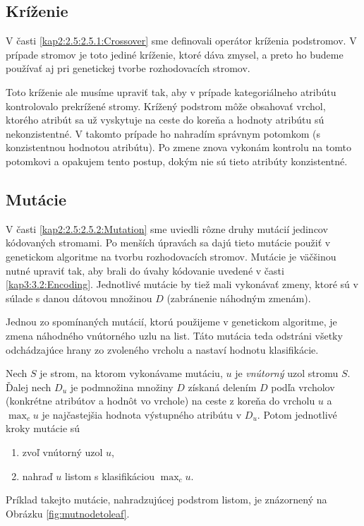 \subsection{Kríženie}\label{kap3:3.4:3.4.1:Crossover}
V časti \ref{kap2:2.5:2.5.1:Crossover} sme definovali operátor kríženia podstromov. V prípade stromov je toto jediné kríženie, ktoré dáva zmysel, a preto ho budeme používať aj pri genetickej tvorbe rozhodovacích stromov.

Toto kríženie ale musíme upraviť tak, aby v prípade kategoriálneho atribútu kontrolovalo prekrížené stromy. Krížený podstrom môže obsahovať vrchol, ktorého atribút sa už vyskytuje na ceste do koreňa a hodnoty atribútu sú nekonzistentné. V takomto prípade ho nahradím správnym potomkom (s konzistentnou hodnotou atribútu). Po zmene znova vykonám kontrolu na tomto potomkovi a opakujem tento postup, dokým nie sú tieto atribúty konzistentné.

\subsection{Mutácie}\label{kap3:3.4:3.4.2:Mutation}
V časti \ref{kap2:2.5:2.5.2:Mutation} sme uviedli rôzne druhy mutácií jedincov kódovaných stromami. Po menších úpravách sa dajú tieto mutácie použiť v genetickom algoritme na tvorbu rozhodovacích stromov. Mutácie je väčšinou nutné upraviť tak, aby brali do úvahy kódovanie uvedené v časti \ref{kap3:3.2:Encoding}. Jednotlivé mutácie by tiež mali vykonávať zmeny, ktoré sú v súlade s danou dátovou množinou $D$ (zabránenie náhodným zmenám).

Jednou zo spomínaných mutácií, ktorú použijeme v genetickom algoritme, je zmena náhodného vnútorného uzlu na list. Táto mutácia teda odstráni všetky odchádzajúce hrany zo zvoleného vrcholu a nastaví hodnotu klasifikácie.

Nech $S$ je strom, na ktorom vykonávame mutáciu, $u$ je \emph{vnútorný} uzol stromu $S$. Ďalej nech $D_u$ je podmnožina množiny $D$ získaná delením $D$ podľa vrcholov (konkrétne atribútov a hodnôt vo vrchole) na ceste z koreňa do vrcholu $u$ a $\max_c u$ je najčastejšia hodnota výstupného atribútu v $D_u$. Potom jednotlivé kroky mutácie sú
\begin{enumerate}
\item zvoľ vnútorný uzol $u$,
\item nahraď $u$ listom s klasifikáciou $\max_c u$.
\end{enumerate}
Príklad takejto mutácie, nahradzujúcej podstrom listom, je znázornený na Obrázku \ref{fig:mutnodetoleaf}.

